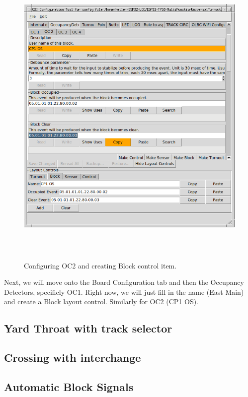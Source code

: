 \documentclass[12pt,twoside]{article}
\begin{document}
\begin{figure}[hbpt]\begin{centering}%
\includegraphics[height=6in]{ExampleSidingCP1-ConfigOC2.png}
\caption{Configuring OC2 and creating Block control item.}
\label{fig:ExampleSidingCP1-ConfigOC2}
\end{centering}\end{figure}

Next, we will move onto the Board Configuration tab and then the Occupancy
Detectors, specificly OC1. Right now, we will just fill in the name (East
Main) and create a Block layout control. Similarly for OC2 (CP1 OS).


\clearpage
\subsection{Yard Throat with track selector}
\label{sect-appl:yardthroat}

\subsection{Crossing with interchange}
\label{sect-appl:crossinginterchange}

\subsection{Automatic Block Signals}
\label{sect-appl:ABS}
\end{document}
